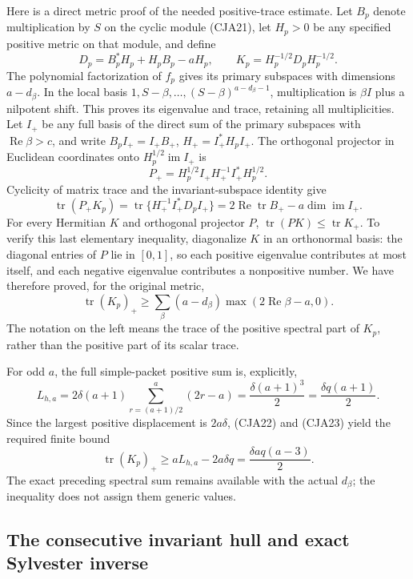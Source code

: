 Here is a direct metric proof of the needed positive-trace estimate.
Let \(B_p\) denote multiplication by \(S\) on the cyclic module
(CJA21), let \(H_p>0\) be any specified positive metric on that
module, and define
\[
 D_p=B_p^*H_p+H_pB_p-aH_p,\qquad
 K_p=H_p^{-1/2}D_pH_p^{-1/2}.
\]
The polynomial factorization of \(f_p\) gives its primary subspaces
with dimensions \(a-d_\beta\).
In the local basis \(1,S-\beta,\ldots,(S-\beta)^{a-d_\beta-1}\),
multiplication is \(\beta I\) plus a nilpotent shift.
This proves its eigenvalue and trace, retaining all multiplicities.
Let \(I_+\) be any full basis of the direct sum of the primary
subspaces with \(\operatorname{Re}\beta>c\), and write
\(B_pI_+=I_+B_+\), \(H_+=I_+^*H_pI_+\).
The orthogonal projector in Euclidean coordinates onto
\(H_p^{1/2}\operatorname{im}I_+\) is
\[
 P_+=H_p^{1/2}I_+H_+^{-1}I_+^*H_p^{1/2}.
 \]
Cyclicity of matrix trace and the invariant-subspace identity give
\[
 \operatorname{tr}(P_+K_p)
  =\operatorname{tr}\{H_+^{-1}I_+^*D_pI_+\}
  =2\operatorname{Re}\operatorname{tr}B_+
                  -a\dim\operatorname{im}I_+ .
\]
For every Hermitian \(K\) and orthogonal projector \(P\),
\(\operatorname{tr}(PK)\leq\operatorname{tr}K_+\).
To verify this last elementary inequality, diagonalize \(K\) in an
orthonormal basis: the diagonal entries of \(P\) lie in \([0,1]\),
so each positive eigenvalue contributes at most itself, and each
negative eigenvalue contributes a nonpositive number.
We have therefore proved, for the original metric,
\begin{equation}
 \operatorname{tr}(K_p)_+
 \geq\sum_{\beta}(a-d_\beta)
               \max(2\operatorname{Re}\beta-a,0).
 \tag{CJA23}
\end{equation}
The notation on the left means the trace of the positive spectral
part of \(K_p\), rather than the positive part of its scalar trace.

For odd \(a\), the full simple-packet positive sum is, explicitly,
\[
 L_{h,a}
 =2\delta(a+1)\sum_{r=(a+1)/2}^{a}(2r-a)
 =\frac{\delta(a+1)^3}{2}
 =\frac{\delta q(a+1)}2 .
\]
Since the largest positive displacement is \(2a\delta\), (CJA22)
and (CJA23) yield the required finite bound
\begin{equation}
 \operatorname{tr}(K_p)_+
 \geq aL_{h,a}-2a\delta q
 =\frac{\delta aq(a-3)}2 .
 \tag{CJA24}
\end{equation}
The exact preceding spectral sum remains available with the actual
\(d_\beta\); the inequality does not assign them generic values.

\subsection{The consecutive invariant hull and exact Sylvester inverse}


